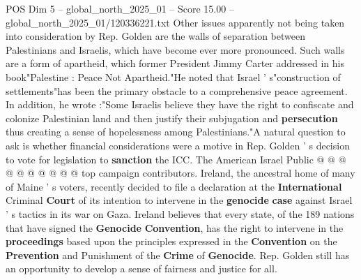 \begin{textsample}{POS Dim 5 – global\_north\_2025\_01 – Score 15.00 – global\_north\_2025\_01/120336221.txt}
Other issues apparently not being taken into consideration by Rep.
Golden are the walls of separation between Palestinians and Israelis, which have become ever more pronounced.
Such walls are a form of apartheid, which former President Jimmy Carter addressed in his book"Palestine : Peace Not Apartheid."He noted that Israel ' s"construction of settlements"has been the primary obstacle to a comprehensive peace agreement.
In addition, he wrote :"Some Israelis believe they have the right to confiscate and colonize Palestinian land and then justify their subjugation and \textbf{persecution} thus creating a sense of hopelessness among Palestinians."A natural question to ask is whether financial considerations were a motive in Rep.
Golden ' s decision to vote for legislation to \textbf{sanction} the ICC.
The American Israel Public @ @ @ @ @ @ @ @ @ @ top campaign contributors.
Ireland, the ancestral home of many of Maine ' s voters, recently decided to file a declaration at the \textbf{International} Criminal \textbf{Court} of its intention to intervene in the \textbf{genocide} \textbf{case} against Israel ' s tactics in its war on Gaza.
Ireland believes that every state, of the 189 nations that have signed the \textbf{Genocide} \textbf{Convention}, has the right to intervene in the \textbf{proceedings} based upon the principles expressed in the \textbf{Convention} on the \textbf{Prevention} and Punishment of the \textbf{Crime} of \textbf{Genocide}.
Rep.
Golden still has an opportunity to develop a sense of fairness and justice for all.

\end{textsample}
